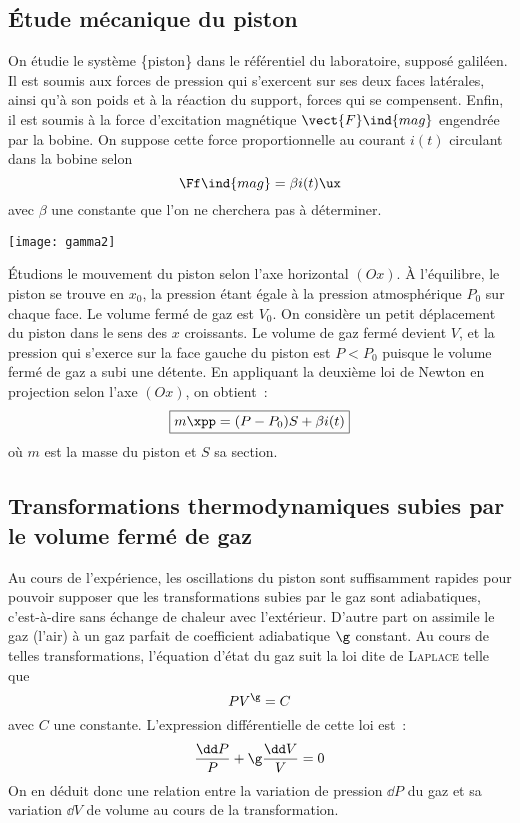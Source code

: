 \documentclass[a4paper, 11pt, final, garamond]{book}
\begin{document}
\subsection{Étude mécanique du piston}
\begin{minipage}{0.56\linewidth}
    On étudie le système \{piston\} dans le référentiel du laboratoire, supposé
    galiléen. Il est soumis aux forces de pression qui s'exercent sur ses deux
    faces latérales, ainsi qu'à son poids et à la réaction du support, forces
    qui se compensent. Enfin, il est soumis à la force d'excitation magnétique
    $\vect{F}\ind{mag}$ engendrée par la bobine. On suppose cette force
    proportionnelle au courant $i(t)$ circulant dans la bobine selon
    \[
        \Ff\ind{mag} = \beta i(t) \ux
    \]
    avec $\beta$ une constante que l'on ne cherchera pas à déterminer. 
\end{minipage}
\hfill
\begin{minipage}{0.40\linewidth}
    \begin{center}
        \texttt{[image: gamma2]}
    \end{center}
\end{minipage} \bigbreak
Étudions le mouvement du piston selon l'axe horizontal $(Ox)$. À l'équilibre, le
piston se trouve en $x_0$, la pression étant égale à la pression atmosphérique
$P_0$ sur chaque face. Le volume fermé de gaz est $V_0$. On considère un petit
déplacement du piston dans le sens des $x$ croissants. Le volume de gaz fermé
devient $V$, et la pression qui s'exerce sur la face gauche du piston est $P <
P_0$ puisque le volume fermé de gaz a subi une détente. En appliquant la
deuxième loi de Newton en projection selon l'axe $(Ox)$, on obtient~:
\[
    \boxed{m\xpp = (P-P_0)S + \beta i(t)}
\]
où $m$ est la masse du piston et $S$ sa section.

\subsection{Transformations thermodynamiques subies par le volume fermé de gaz}

Au cours de l'expérience, les oscillations du piston sont suffisamment rapides
pour pouvoir supposer que les transformations subies par le gaz sont
adiabatiques, c'est-à-dire sans échange de chaleur avec l'extérieur. D'autre
part on assimile le gaz (l'air) à un gaz parfait de coefficient adiabatique $\g$
constant. Au cours de telles transformations, l'équation d'état du gaz suit la
loi dite de \textsc{Laplace} telle que
\[
    PV^\g = C
\]
avec $C$ une constante. L'expression différentielle de cette loi est~:
\[
    \frac{\dd P}{P} + \g \frac{\dd V}{V} = 0
\]
On en déduit donc une relation entre la variation de pression $\dd P$ du gaz et
sa variation $\dd V$ de volume au cours de la transformation.
\end{document}
